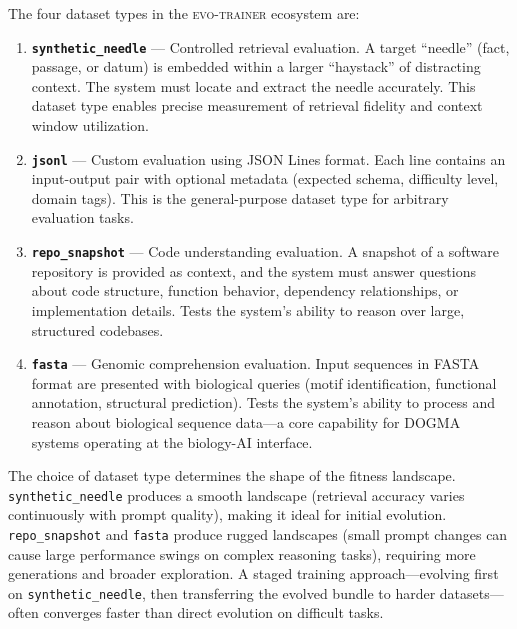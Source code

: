 \begin{dogmadef}
The four dataset types in the \textsc{evo-trainer} ecosystem are:
\begin{enumerate}[leftmargin=1.5em]
  \item \textbf{\texttt{synthetic\_needle}} --- Controlled retrieval evaluation. A target ``needle'' (fact, passage, or datum) is embedded within a larger ``haystack'' of distracting context. The system must locate and extract the needle accurately. This dataset type enables precise measurement of retrieval fidelity and context window utilization.

  \item \textbf{\texttt{jsonl}} --- Custom evaluation using JSON Lines format. Each line contains an input-output pair with optional metadata (expected schema, difficulty level, domain tags). This is the general-purpose dataset type for arbitrary evaluation tasks.

  \item \textbf{\texttt{repo\_snapshot}} --- Code understanding evaluation. A snapshot of a software repository is provided as context, and the system must answer questions about code structure, function behavior, dependency relationships, or implementation details. Tests the system's ability to reason over large, structured codebases.

  \item \textbf{\texttt{fasta}} --- Genomic comprehension evaluation. Input sequences in FASTA format are presented with biological queries (motif identification, functional annotation, structural prediction). Tests the system's ability to process and reason about biological sequence data---a core capability for DOGMA systems operating at the biology-AI interface.
\end{enumerate}
\end{dogmadef}

\begin{implnote}
The choice of dataset type determines the shape of the fitness landscape. \texttt{synthetic\_needle} produces a smooth landscape (retrieval accuracy varies continuously with prompt quality), making it ideal for initial evolution. \texttt{repo\_snapshot} and \texttt{fasta} produce rugged landscapes (small prompt changes can cause large performance swings on complex reasoning tasks), requiring more generations and broader exploration. A staged training approach---evolving first on \texttt{synthetic\_needle}, then transferring the evolved bundle to harder datasets---often converges faster than direct evolution on difficult tasks.
\end{implnote}

